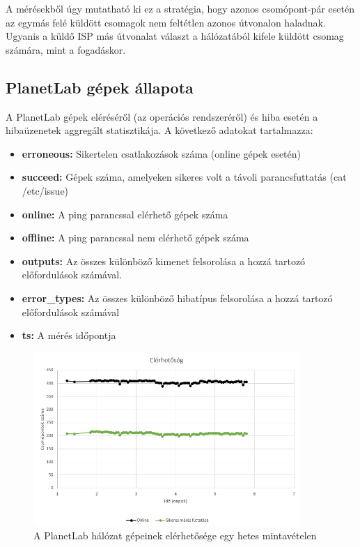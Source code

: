 
A mérésekből úgy mutatható ki ez a stratégia, hogy azonos csomópont-pár esetén az egymás felé küldött csomagok nem feltétlen azonos útvonalon haladnak. Ugyanis a küldő ISP más útvonalat választ a hálózatából kifele küldött csomag számára, mint a fogadáskor.

\subsection*{PlanetLab gépek állapota}
A PlanetLab gépek eléréséről (az operációs rendszeréről) és hiba esetén a hibaüzenetek aggregált statisztikája. A következő adatokat tartalmazza:

\begin{itemize}
\item \textbf{erroneous:} Sikertelen csatlakozások száma (online gépek esetén)
\item \textbf{succeed:} Gépek száma, amelyeken sikeres volt a távoli parancsfuttatás (cat /etc/issue)
\item \textbf{online:} A ping parancssal elérhető gépek száma
\item \textbf{offline:} A ping parancssal nem elérhető gépek száma
\item \textbf{outputs:} Az összes különböző kimenet felsorolása a hozzá tartozó előfordulások számával.
\item \textbf{error\_types:} Az összes különböző hibatípus felsorolása a hozzá tartozó előfordulások számával
\item \textbf{ts:} A mérés időpontja
\end{itemize}

\begin{figure}[!ht]
	\centering
	\includegraphics[width=0.9\textwidth, keepaspectratio]{figures/availability.PNG}
	\caption{A PlanetLab hálózat gépeinek elérhetősége egy hetes mintavételen}
	\label{fig:availability}
\end{figure}

